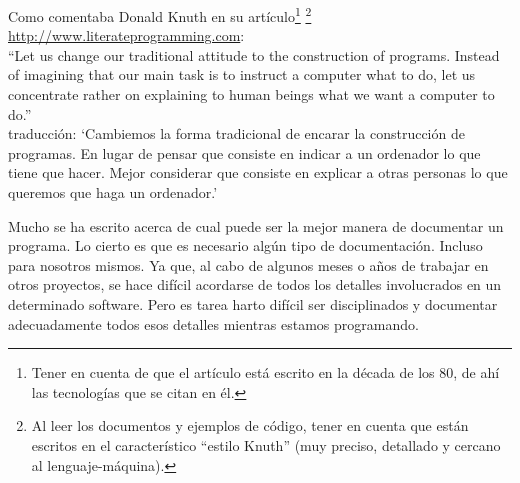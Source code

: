 \documentclass[spanish,12pt,a4paper,final,oneside]{book}
\begin{document}
Como comentaba Donald Knuth en su artículo\footnote{Tener en cuenta de que el artículo está escrito en la década de los 80, de ahí las tecnologías que se citan en él.}
\footnote{Al leer los documentos y ejemplos de código, tener en cuenta que están escritos en el característico ``estilo Knuth'' (muy preciso, detallado y cercano al lenguaje-máquina).}
 \url{http://www.literateprogramming.com}: 
\\``Let us change our traditional attitude to the construction of programs. Instead of imagining that our main task is to instruct a computer what to do, let us concentrate rather on explaining to human beings what we want a computer to do.''
\\traducción: ‘Cambiemos la forma tradicional de encarar la construcción de programas. En lugar de pensar que consiste en indicar a un ordenador lo que tiene que hacer. Mejor considerar que consiste en explicar a otras personas lo que queremos que haga un ordenador.’

Mucho se ha escrito acerca de cual puede ser la mejor manera de documentar un programa. Lo cierto es que es necesario algún tipo de documentación. Incluso para nosotros mismos. Ya que, al cabo de algunos meses o años de trabajar en otros proyectos, se hace difícil acordarse de todos los detalles involucrados en un determinado software. Pero es tarea harto difícil ser disciplinados y documentar adecuadamente todos esos detalles mientras estamos programando.
\end{document}
